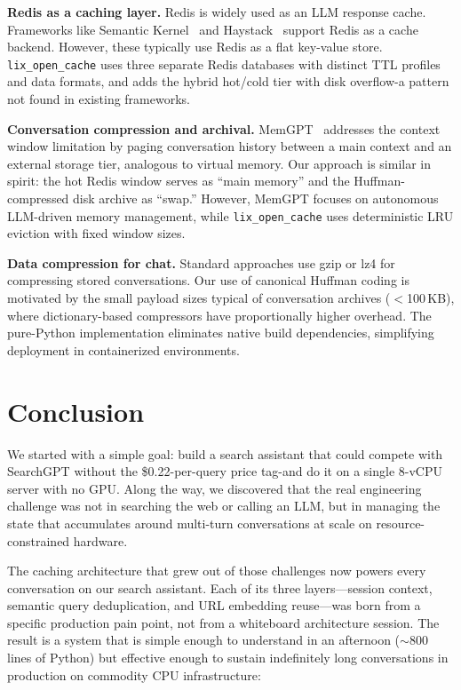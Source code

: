 \documentclass[conference]{IEEEtran}
\begin{document}
\textbf{Redis as a caching layer.}
Redis is widely used as an LLM response cache. Frameworks like Semantic Kernel~\cite{semantic_kernel2023} and Haystack~\cite{haystack2023} support Redis as a cache backend. However, these typically use Redis as a flat key-value store. \texttt{lix\_open\_cache} uses three separate Redis databases with distinct TTL profiles and data formats, and adds the hybrid hot/cold tier with disk overflow-a pattern not found in existing frameworks.

\textbf{Conversation compression and archival.}
MemGPT~\cite{memgpt2023} addresses the context window limitation by paging conversation history between a main context and an external storage tier, analogous to virtual memory. Our approach is similar in spirit: the hot Redis window serves as ``main memory'' and the Huffman-compressed disk archive as ``swap.'' However, MemGPT focuses on autonomous LLM-driven memory management, while \texttt{lix\_open\_cache} uses deterministic LRU eviction with fixed window sizes.

\textbf{Data compression for chat.}
Standard approaches use gzip or lz4 for compressing stored conversations. Our use of canonical Huffman coding is motivated by the small payload sizes typical of conversation archives ($<$100\,KB), where dictionary-based compressors have proportionally higher overhead. The pure-Python implementation eliminates native build dependencies, simplifying deployment in containerized environments.

\section{Conclusion}
\label{sec:conclusion}

We started with a simple goal: build a search assistant that could compete with SearchGPT without the \$0.22-per-query price tag-and do it on a single 8-vCPU server with no GPU. Along the way, we discovered that the real engineering challenge was not in searching the web or calling an LLM, but in managing the state that accumulates around multi-turn conversations at scale on resource-constrained hardware.

The caching architecture that grew out of those challenges now powers every conversation on our search assistant. Each of its three layers---session context, semantic query deduplication, and URL embedding reuse---was born from a specific production pain point, not from a whiteboard architecture session. The result is a system that is simple enough to understand in an afternoon (${\sim}800$ lines of Python) but effective enough to sustain indefinitely long conversations in production on commodity CPU infrastructure:
\end{document}
